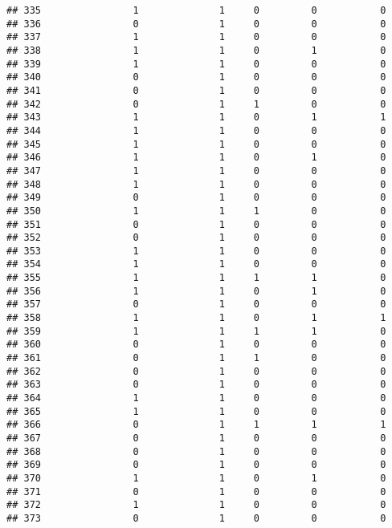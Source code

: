 \documentclass[]{article}
\begin{document}
\begin{verbatim}
## 335                1              1     0         0           0
## 336                0              1     0         0           0
## 337                1              1     0         0           0
## 338                1              1     0         1           0
## 339                1              1     0         0           0
## 340                0              1     0         0           0
## 341                0              1     0         0           0
## 342                0              1     1         0           0
## 343                1              1     0         1           1
## 344                1              1     0         0           0
## 345                1              1     0         0           0
## 346                1              1     0         1           0
## 347                1              1     0         0           0
## 348                1              1     0         0           0
## 349                0              1     0         0           0
## 350                1              1     1         0           0
## 351                0              1     0         0           0
## 352                0              1     0         0           0
## 353                1              1     0         0           0
## 354                1              1     0         0           0
## 355                1              1     1         1           0
## 356                1              1     0         1           0
## 357                0              1     0         0           0
## 358                1              1     0         1           1
## 359                1              1     1         1           0
## 360                0              1     0         0           0
## 361                0              1     1         0           0
## 362                0              1     0         0           0
## 363                0              1     0         0           0
## 364                1              1     0         0           0
## 365                1              1     0         0           0
## 366                0              1     1         1           1
## 367                0              1     0         0           0
## 368                0              1     0         0           0
## 369                0              1     0         0           0
## 370                1              1     0         1           0
## 371                0              1     0         0           0
## 372                1              1     0         0           0
## 373                0              1     0         0           0

\end{verbatim}
\end{document}
